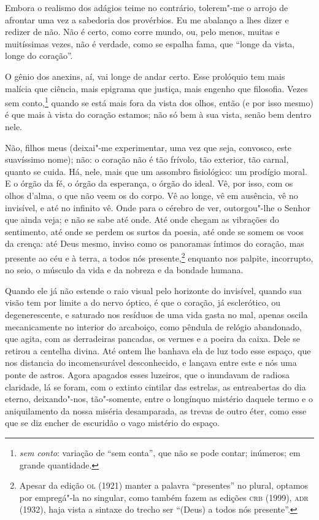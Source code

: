 Embora o realismo dos adágios teime no contrário, tolerem"-me o
arrojo de afrontar uma vez a sabedoria dos provérbios. Eu me abalanço a
lhes dizer e redizer de não. Não é certo, como corre mundo, ou, pelo
menos, muitas e muitíssimas vezes, não é verdade, como se espalha fama,
que ``longe da vista, longe do coração''.

O gênio dos anexins, aí, vai longe de andar certo. Esse prolóquio
tem mais malícia que ciência, mais epigrama que justiça, mais engenho
que filosofia. Vezes sem conto,\footnote{ \textit{sem conto}:  variação
de “sem conta”, que não se pode contar; inúmeros; em grande
quantidade.} quando se está mais fora da vista dos olhos, então (e por
isso mesmo) é que mais à vista do coração estamos; não só bem à sua
vista, senão bem dentro nele.

Não, filhos meus (deixai"-me experimentar, uma vez que seja,
convosco, este suavíssimo nome); não: o coração não é tão frívolo, tão
exterior, tão carnal, quanto se cuida. Há, nele, mais que um assombro
fisiológico: um prodígio moral. E o órgão da fé, o órgão da esperança,
o órgão do ideal. Vê, por isso, com os olhos d'alma, o
que não veem os do corpo. Vê ao longe, vê em ausência, vê no invisível,
e até no infinito vê. Onde para o cérebro de ver, outorgou"-lhe o Senhor
que ainda veja; e não se sabe até onde. Até onde chegam as vibrações do
sentimento, até onde se perdem os surtos da poesia, até onde se somem
os voos da crença: até Deus mesmo, inviso como os panoramas íntimos do
coração, mas presente ao céu e à terra, a todos nós presente,\footnote{ Apesar 
da edição \textsc{ol} (1921) manter a palavra “presentes” no plural,
optamos por empregá"-la no singular, como também fazem as edições \textsc{crb}
(1999), \textsc{adr} (1932), haja vista a sintaxe do trecho ser “(Deus) a todos
nós presente”.} enquanto nos palpite, incorrupto, no seio, o
músculo da vida e da nobreza e da bondade humana.

Quando ele já não estende o raio visual pelo horizonte do
invisível, quando sua visão tem por limite a do nervo óptico, é que o
coração, já esclerótico, ou degenerescente, e saturado nos resíduos de
uma vida gasta no mal, apenas oscila mecanicamente no interior do
arcaboiço, como pêndula de relógio abandonado, que agita, com as
derradeiras pancadas, os vermes e a poeira da caixa. Dele se retirou a
centelha divina. Até ontem lhe banhava ela de luz todo esse espaço, que
nos distancia do incomensurável desconhecido, e lançava entre este e
nós uma ponte de astros. Agora apagados esses luzeiros, que o inundavam
de radiosa claridade, lá se foram, com o extinto cintilar das estrelas,
as entreabertas do dia eterno, deixando"-nos, tão"-somente, entre o
longínquo mistério daquele termo e o aniquilamento da nossa miséria
desamparada, as trevas de outro éter, como esse que se diz encher de
escuridão o vago mistério do espaço.

